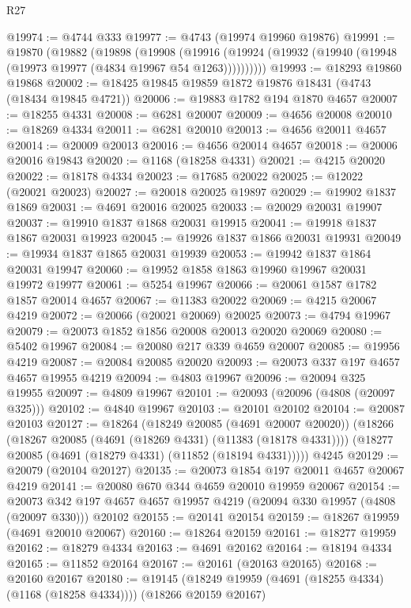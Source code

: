 \begin{lexlean}{R27}
\begin{coremodule}
@19974 := @4744 @333
@19977 := @4743 (@19974 @19960 @19876)
@19991 := @19870
    (@19882
      (@19898
        (@19908
          (@19916 (@19924 (@19932 (@19940 (@19948 (@19973 @19977 (@4834 @19967 @54 @1263))))))))))
@19993 := @18293 @19860 @19868
@20002 := @18425 @19845 @19859 @1872 @19876 @18431 (@4743 (@18434 @19845 @4721))
@20006 := @19883 @1782 @194 @1870 @4657
@20007 := @18255 @4331
@20008 := @6281 @20007
@20009 := @4656 @20008
@20010 := @18269 @4334
@20011 := @6281 @20010
@20013 := @4656 @20011 @4657
@20014 := @20009 @20013
@20016 := @4656 @20014 @4657
@20018 := @20006 @20016 @19843
@20020 := @1168 (@18258 @4331)
@20021 := @4215 @20020
@20022 := @18178 @4334
@20023 := @17685 @20022
@20025 := @12022 (@20021 @20023)
@20027 := @20018 @20025 @19897
@20029 := @19902 @1837 @1869
@20031 := @4691 @20016 @20025
@20033 := @20029 @20031 @19907
@20037 := @19910 @1837 @1868 @20031 @19915
@20041 := @19918 @1837 @1867 @20031 @19923
@20045 := @19926 @1837 @1866 @20031 @19931
@20049 := @19934 @1837 @1865 @20031 @19939
@20053 := @19942 @1837 @1864 @20031 @19947
@20060 := @19952 @1858 @1863 @19960 @19967 @20031 @19972 @19977
@20061 := @5254 @19967
@20066 := @20061 @1587 @1782 @1857 @20014 @4657
@20067 := @11383 @20022
@20069 := @4215 @20067 @4219
@20072 := @20066 (@20021 @20069) @20025
@20073 := @4794 @19967
@20079 := @20073 @1852 @1856 @20008 @20013 @20020 @20069
@20080 := @5402 @19967
@20084 := @20080 @217 @339 @4659 @20007
@20085 := @19956 @4219
@20087 := @20084 @20085 @20020
@20093 := @20073 @337 @197 @4657 @4657 @19955 @4219
@20094 := @4803 @19967
@20096 := @20094 @325 @19955
@20097 := @4809 @19967
@20101 := @20093 (@20096 (@4808 (@20097 @325)))
@20102 := @4840 @19967
@20103 := @20101 @20102
@20104 := @20087 @20103
@20127 := @18264
    (@18249 @20085 (@4691 @20007 @20020))
    (@18266
      (@18267 @20085 (@4691 (@18269 @4331) (@11383 (@18178 @4331))))
      (@18277 @20085 (@4691 (@18279 @4331) (@11852 (@18194 @4331)))))
    @4245
@20129 := @20079 (@20104 @20127)
@20135 := @20073 @1854 @197 @20011 @4657 @20067 @4219
@20141 := @20080 @670 @344 @4659 @20010 @19959 @20067
@20154 := @20073
    @342
    @197
    @4657
    @4657
    @19957
    @4219
    (@20094 @330 @19957 (@4808 (@20097 @330)))
    @20102
@20155 := @20141 @20154
@20159 := @18267 @19959 (@4691 @20010 @20067)
@20160 := @18264 @20159
@20161 := @18277 @19959
@20162 := @18279 @4334
@20163 := @4691 @20162
@20164 := @18194 @4334
@20165 := @11852 @20164
@20167 := @20161 (@20163 @20165)
@20168 := @20160 @20167
@20180 := @19145
    (@18249 @19959 (@4691 (@18255 @4334) (@1168 (@18258 @4334))))
    (@18266 @20159 @20167)

\end{coremodule}
\end{lexlean}
